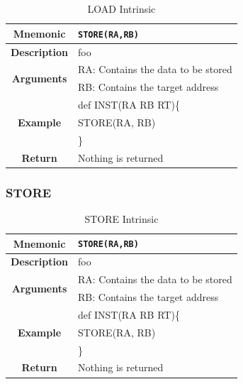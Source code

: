 \documentclass{article}
\begin{document}
\begin{table}[h]
\begin{center}
\caption{LOAD Intrinsic}
\vspace{0.125in}
\label{tab:LOADIntrinsic}
\begin{tabular}{|c|l|}
\hline
\textbf{Mnemonic} & \texttt{STORE(RA,RB)}\\
\hline
\textbf{Description} & foo\\
\hline
\multirow{2}{*}{\textbf{Arguments}} & RA: Contains the data to be stored\\
                          			     & RB: Contains the target address \\
\hline
\multirow{3}{*}{\textbf{Example}} & def INST(RA RB RT)\{\\
                          			  &   STORE(RA, RB)\\
                                                    & \}\\
\hline
\textbf{Return} & Nothing is returned\\                                                    
\hline
\end{tabular}
\end{center}
\end{table}

\clearpage
\subsubsection{STORE}
\label{sec:STORE}

\begin{table}[h]
\begin{center}
\caption{STORE Intrinsic}
\vspace{0.125in}
\label{tab:STOREIntrinsic}
\begin{tabular}{|c|l|}
\hline
\textbf{Mnemonic} & \texttt{STORE(RA,RB)}\\
\hline
\textbf{Description} & foo\\
\hline
\multirow{2}{*}{\textbf{Arguments}} & RA: Contains the data to be stored\\
                          			     & RB: Contains the target address \\
\hline
\multirow{3}{*}{\textbf{Example}} & def INST(RA RB RT)\{\\
                          			  &   STORE(RA, RB)\\
                                                    & \}\\
\hline
\textbf{Return} & Nothing is returned\\                                                    
\hline
\end{tabular}
\end{center}
\end{table}
\end{document}
